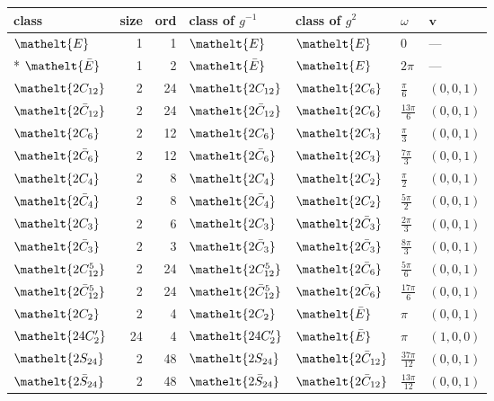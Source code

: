 \documentclass[10pt,a4paper]{article}
\numberwithin{equation}{section}
\newcommand{\eltfont}[1]{{\let\sigma\eltsigma\mathelt{#1}}}
\newcommand{\cls}[1]{\eltfont{#1}}
\newcommand{\dirvec}[3]{(#1, #2, #3)}
\newcommand{\vv}{\mathbf{v}}
\newcommand{\barred}[1]{\bar{#1}}
\begin{document}
{\renewcommand{\arraystretch}{1.3}\begin{longtable}{@{}lrrllll@{}}\toprule
class & size & ord & class of $g^{-1}$ & class of $g^{2}$ & $\omega$ & $\vv$\\\midrule\endhead
\bottomrule\endfoot\endlastfoot
$\cls{E}$ & 1 & 1 & $\cls{E}$ & $\cls{E}$ & $0$ & ---\\*
$\cls{\barred{E}}$ & 1 & 2 & $\cls{\barred{E}}$ & $\cls{E}$ & $2\pi$ & ---\\
$\cls{2C_{12}}$ & 2 & 24 & $\cls{2C_{12}}$ & $\cls{2C_{6}}$ & $\tfrac{\pi}{6}$ & $\dirvec{0}{0}{1}$\\
$\cls{2\barred{C}_{12}}$ & 2 & 24 & $\cls{2\barred{C}_{12}}$ & $\cls{2C_{6}}$ & $\tfrac{13\pi}{6}$ & $\dirvec{0}{0}{1}$\\
$\cls{2C_{6}}$ & 2 & 12 & $\cls{2C_{6}}$ & $\cls{2C_{3}}$ & $\tfrac{\pi}{3}$ & $\dirvec{0}{0}{1}$\\
$\cls{2\barred{C}_{6}}$ & 2 & 12 & $\cls{2\barred{C}_{6}}$ & $\cls{2C_{3}}$ & $\tfrac{7\pi}{3}$ & $\dirvec{0}{0}{1}$\\
$\cls{2C_{4}}$ & 2 & 8 & $\cls{2C_{4}}$ & $\cls{2C_{2}}$ & $\tfrac{\pi}{2}$ & $\dirvec{0}{0}{1}$\\
$\cls{2\barred{C}_{4}}$ & 2 & 8 & $\cls{2\barred{C}_{4}}$ & $\cls{2C_{2}}$ & $\tfrac{5\pi}{2}$ & $\dirvec{0}{0}{1}$\\
$\cls{2C_{3}}$ & 2 & 6 & $\cls{2C_{3}}$ & $\cls{2\barred{C}_{3}}$ & $\tfrac{2\pi}{3}$ & $\dirvec{0}{0}{1}$\\
$\cls{2\barred{C}_{3}}$ & 2 & 3 & $\cls{2\barred{C}_{3}}$ & $\cls{2\barred{C}_{3}}$ & $\tfrac{8\pi}{3}$ & $\dirvec{0}{0}{1}$\\
$\cls{2C_{12}^{5}}$ & 2 & 24 & $\cls{2C_{12}^{5}}$ & $\cls{2\barred{C}_{6}}$ & $\tfrac{5\pi}{6}$ & $\dirvec{0}{0}{1}$\\
$\cls{2\barred{C}_{12}^{5}}$ & 2 & 24 & $\cls{2\barred{C}_{12}^{5}}$ & $\cls{2\barred{C}_{6}}$ & $\tfrac{17\pi}{6}$ & $\dirvec{0}{0}{1}$\\
$\cls{2C_{2}}$ & 2 & 4 & $\cls{2C_{2}}$ & $\cls{\barred{E}}$ & $\pi$ & $\dirvec{0}{0}{1}$\\
$\cls{24C_{2}'}$ & 24 & 4 & $\cls{24C_{2}'}$ & $\cls{\barred{E}}$ & $\pi$ & $\dirvec{1}{0}{0}$\\
$\cls{2S_{24}}$ & 2 & 48 & $\cls{2S_{24}}$ & $\cls{2\barred{C}_{12}}$ & $\tfrac{37\pi}{12}$ & $\dirvec{0}{0}{1}$\\
$\cls{2\barred{S}_{24}}$ & 2 & 48 & $\cls{2\barred{S}_{24}}$ & $\cls{2\barred{C}_{12}}$ & $\tfrac{13\pi}{12}$ & $\dirvec{0}{0}{1}$\\

\end{longtable}}
\end{document}
